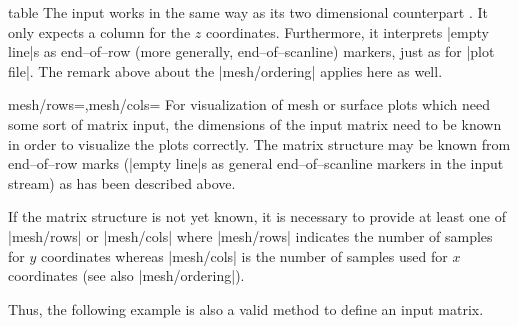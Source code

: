 {\begin{addplot3operation}[]{table}{}
	The  input works in the same way as its two dimensional counterpart . It only expects a column for the $z$ coordinates. Furthermore, it interprets |empty line|s as end--of--row (more generally, end--of--scanline) markers, just as for |plot file|. The remark above about the |mesh/ordering| applies here as well.

\begin{codeexample}[]
\end{codeexample}
\end{addplot3operation}

\begin{pgfplotskeylist}{mesh/rows=,mesh/cols=}
	For visualization of mesh or surface plots which need some sort of matrix input, the dimensions of the input matrix need to be known in order to visualize the plots correctly. The matrix structure may be known from end--of--row marks (|empty line|s as general end--of--scanline markers in the input stream) as has been described above.

	If the matrix structure is not yet known, it is necessary to provide at least one of |mesh/rows| or |mesh/cols| where |mesh/rows| indicates the number of samples for $y$ coordinates whereas |mesh/cols| is the number of samples used for $x$ coordinates (see also |mesh/ordering|). 

	Thus, the following example is also a valid method to define an input matrix.
\begin{codeexample}[]
\end{codeexample}


\end{pgfplotskeylist}}
